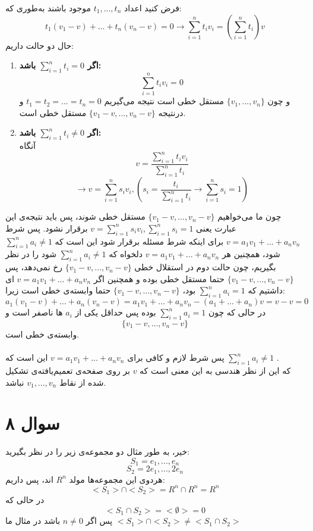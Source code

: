 \documentclass[12pt,a4paper]{article}
\begin{document}
فرض کنید اعداد 
$t_1, ..., t_n$
موجود باشند به‌طوری که:
\[
t_1 (v_1 - v) + ... + t_n (v_n - v) = 0 \rightarrow \sum_{i=1}^n t_i v_i = (\sum_{i=1}^n t_i) v
\]
حال دو حالت داریم:
\begin{enumerate}
	\item 
\textbf{	اگر 
	$\sum_{i=1}^n t_i = 0$
	باشد:}
\\
\[
\sum_{i=1}^n t_i v_i = 0
\]
و چون 
$\{v_1, ..., v_n\}$
مستقل خطی است نتیجه می‌گیریم
$t_1 = t_2 = ... = t_n = 0$
و درنتیجه 
$\{v_1 - v, ..., v_n - v\}$
مستقل خطی است.
\item
\textbf{
اگر 
$\sum_{i=1}^n t_i \neq 0$
باشد:
}
\\
آنگاه 
\[v = \frac{\sum_{i=1}^n t_i v_i}{\sum_{i=1}^n t_i}\]
\[
\rightarrow v = \sum_{i=1}^n s_i v_i, (s_i = \frac{t_i}{\sum_{i=1}^n t_i} \rightarrow \sum_{i=1}^n s_i = 1)
\]
\end{enumerate}
چون ما می‌خواهیم $\{v_1 - v, ..., v_n - v\}$ مستقل خطی شوند، پس باید نتیجه‌ی این عبارت یعنی 
$v = \sum_{i=1}^n s_i v_i, \sum_{i=1}^n s_i = 1$
برقرار نشود. پس شرط 
$v = a_1 v_1 + ... +a_n v_n$
 برای اینکه شرط مسئله برقرار شود این است که
$\sum_{i=1}^n a_i \neq 1$
شود، همچنین هر $v = a_1 v_1 + ... +a_n v_n$ دلخواه که 
$\sum_{i=1}^n a_i \neq 1$
شود را در نظر بگیریم، چون حالت دوم در استقلال خطی 
$\{v_1 - v, ..., v_n - v\}$ 
رخ نمی‌دهد، پس $\{v_1 - v, ..., v_n - v\}$  حتما مستقل خطی بوده و همچنین اگر  $v = a_1 v_1 + ... +a_n v_n$ ای داشتیم که 
$\sum_{i=1}^n a_i = 1$
بود، 
$\{v_1 - v, ..., v_n - v\}$ 
حتما وابسته‌ی خطی است زیرا:
\[
a_1 (v_1 - v) + ... + a_n (v_n - v) =a_1 v_1 + ... + a_n v_n - (a_1 + ... + a_n) v = v - v = 0
\]
در حالی که چون 
$\sum_{i=1}^n a_i = 1$
بوده پس حداقل یکی از $a_i$ ها ناصفر است و 
\[\{v_1 - v, ..., v_n - v\}\]
وابسته‌ی خطی است.
\\
\\
 پس شرط لازم و کافی برای 
$v = a_1 v_1 + ... +a_n v_n$
این است که 
$\sum_{i=1}^n a_i \neq 1$
.
\\
که این از نظر هندسی به این معنی است که $v$ بر روی صفحه‌ی تعمیم‌یافته‌ی تشکیل شده از نقاط $v_1, ..., v_n$ نباشد.
\section{سوال ۸}
خیر، به طور مثال دو مجموعه‌ی زیر را در نظر بگیرید:
\[S_1 = {e_1, ..., e_n}\]
\[S_2 = {2e_1, ..., 2e_n}\]
هردوی این مجموعه‌ها مولد $R^n$ اند، پس داریم:
\[<S_1> \cap <S_2> = R^n \cap R^n = R^n\]
در حالی که
\[<S_1 \cap S_2> = <\emptyset> = {0} \]
پس اگر $n \neq 0$ باشد در مثال ما
$<S_1> \cap <S_2> \neq <S_1 \cap S_2>$
\end{document}
